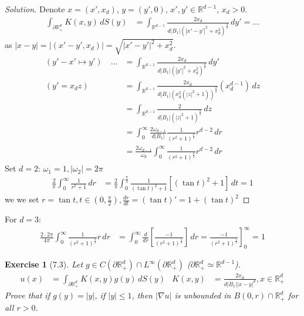 \documentclass{report}
\theoremstyle{tommy}
\newtheorem{ex}[defn]{Exercise}
\begin{document}
  \begin{proof}[Solution]
    Denote \(x = (x', x_d)\), \(y = (y', 0)\), \(x', y' \in \mathbb{R}^{d-1}\), \(x_d > 0\).
    \begin{align*}
      \int_{\partial \mathbb{R}_+^d} K(x,y) \, dS(y) &= \int_{\mathbb{R}^{d-1}} \frac{2 x_d}{d |B_1|\left(|x'-y'|^2 + x_d^2\right)^{\frac{d}{2}}} \, dy' = \dots
    \end{align*}
    as \(|x-y| = |(x'-y', x_d)| = \sqrt{|x'-y'|^2 + x_d^2}\).
    \begin{align*}
      (y'-x' \mapsto y') \quad \dots &= \int_{\mathbb{R}^{d-1}} \frac{2 x_d}{d |B_1|\left(|y'|^2 + x_d^2\right)^{\frac{d}{2}}} \, dy' \\
      (y' = x_d z) \quad &= \int_{\mathbb{R}^{d-1}} \frac{2 x_d}{d |B_1| \left(x_d^2 (|z|^2 + 1)\right)^{\frac{d}{2}}} \left(x_d^{d-1}\right) \, dz \\
      &= \int_{\mathbb{R}^{d-1}} \frac{2}{d|B_1|\left(|z|^2 + 1\right)^{\frac{d}{2}}} \, dz \\
      &= \int_0^\infty \frac{2 \omega_{d-1}}{d|B_1|} \frac{1}{(r^2+1)^{\frac{d}{2}}} r^{d-2} \, dr \\
      &= \frac{2 \omega_{d-1}}{\omega_d} \int_0^\infty \frac{1}{\left(r^2+1\right)^{\frac{d}{2}}} r^{d-2} \, dr
    \end{align*}
    Set \(d = 2\): \(\omega_1 = 1, |\omega_2| = 2 \pi\) 
    \begin{align*}
      \frac{2}{\pi} \int_0^\infty \frac{1}{r^2+1} \, dr 
      &= \frac{2}{\pi} \int_0^{\frac{\pi}{2}} \frac{1}{(\tan t)^2 +1} [(\tan t)^2 +1] \, dt = 1
    \end{align*}
    we we set \(r = \tan t, t \in \left(0, \frac{\pi}{2}\right), \frac{dr}{dt} = (\tan t)' = 1 + (\tan t)^2\)
  \end{proof}
  For \(d = 3\):
  \begin{align*}
    \frac{2 \cdot 2 \pi}{4 \pi} \int_0^\infty \frac{1}{(r^2 + 1)^{\frac{3}{2}}} r \, dr
    &= \int_0^\infty \frac{d}{dr} \left[\frac{-1}{(r^2+1)^{\frac{1}{2}}}\right] \, dr = \left. \frac{-1}{(r^2 + 1)^{\frac{1}{2}}}\right]_0^\infty = 1
  \end{align*}

  \begin{ex}[7.3]
    Let \(g \in C(\partial \mathbb{R}_+^d) \cap L^\infty(\partial \mathbb{R}_+^d)\) (\(\partial \mathbb{R}_+^d \simeq \mathbb{R}^{d-1}\)).
    \begin{align*}
      u(x) &= \int_{\partial \mathbb{R}_+^d} K(x,y) g(y) \, dS(y)
      &K(x,y) &= \frac{2 x_d}{d |B_1| |x-y|^d}, x \in \mathbb{R}_+^d
    \end{align*}
    Prove that if \(g(y) = |y|\), if \(|y| \le 1\), then \(|\nabla u|\) is unbounded in \(B(0,r) \cap \mathbb{R}_+^d\) for all \(r > 0\).
  \end{ex}
\end{document}
